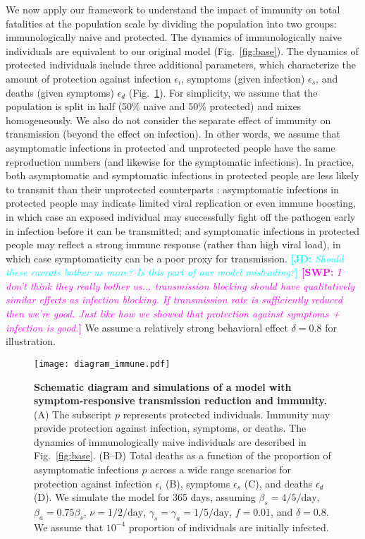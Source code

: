 \documentclass[12pt]{article}
\newcommand{\comment}{\showcomment}
\newcommand{\showcomment}[3]{\textcolor{#1}{\textbf{[#2: }\textsl{#3}\textbf{]}}}
\newcommand{\jd}[1]{\comment{cyan}{JD}{#1}}
\newcommand{\swp}[1]{\comment{magenta}{SWP}{#1}}
\newcommand{\fref}[1]{Fig.~\ref{fig:#1}}
\begin{document}
We now apply our framework to understand the impact of immunity on total fatalities at the population scale by dividing the population into two groups: immunologically naive and protected.
The dynamics of immunologically naive individuals are equivalent to our original model (\fref{base}).
The dynamics of protected individuals include three additional parameters, which characterize the amount of protection against infection $\epsilon_i$, symptoms (given infection) $\epsilon_s$, and deaths (given symptoms) $\epsilon_d$ (\fref{immune}).
For simplicity, we assume that the population is split in half (50\% naive and 50\% protected) and mixes homogeneously. We also do not consider the separate effect of immunity on transmission (beyond the effect on infection). 
In other words, we assume that asymptomatic infections in protected and unprotected people have the same reproduction numbers (and likewise for the symptomatic infections).
In practice, both asymptomatic and symptomatic infections in protected people are less likely to transmit than their unprotected counterparts \citep{lipsitch2020understanding}: asymptomatic infections in protected people may indicate limited viral replication or even immune boosting, in which case an exposed individual may successfully fight off the pathogen early in infection before it can be transmitted; and symptomatic infections in protected people may reflect a strong immune response (rather than high viral load), in which case symptomaticity can be a poor proxy for transmission. \jd{Should these caveats bother us more? Is this part of our model misleading?} \swp{I don't think they really bother us... transmission blocking should have qualitatively similar effects as infection blocking. If transmission rate is sufficiently reduced then we're good. Just like how we showed that protection against symptoms + infection is good.}
We assume a relatively strong behavioral effect $\delta=0.8$ for illustration.

\begin{figure}[!ht]
\texttt{[image: diagram\_immune.pdf]}
\caption{
\textbf{Schematic diagram and simulations of a model with symptom-responsive transmission reduction and immunity.}
(A) The subscript $p$ represents protected individuals. 
Immunity may provide protection against infection, symptoms, or deaths.
The dynamics of immunologically naive individuals are described in \fref{base}.
(B--D) Total deaths as a function of the proportion of asymptomatic infections $p$ across a wide range scenarios for protection against infection $\epsilon_i$ (B), symptoms $\epsilon_s$ (C), and deaths $\epsilon_d$ (D).
We simulate the model for 365 days, assuming $\beta_s = 4/5/\mathrm{day}$, $\beta_a = 0.75 \beta_s$, $\nu=1/2/\mathrm{day}$, $\gamma_s=\gamma_a=1/5/\mathrm{day}$, $f=0.01$, and $\delta=0.8$.
We assume that $10^{-4}$ proportion of individuals are initially infected.
}
\label{fig:immune}
\end{figure}
\end{document}
